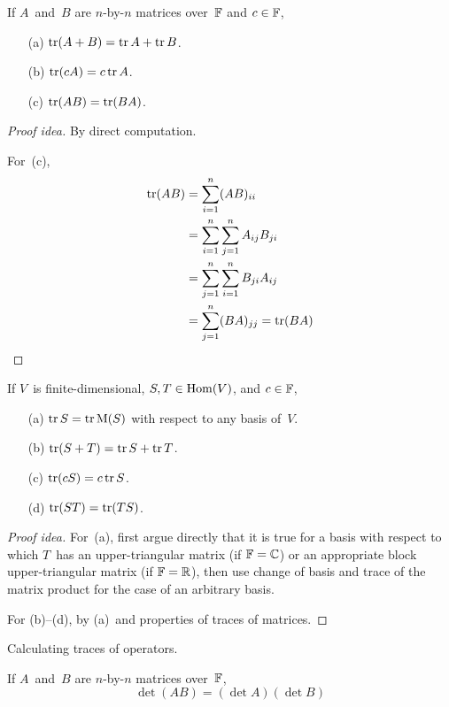 \begin{thm}
If \(A\)~and~\(B\) are \(n\)-by-\(n\) matrices over~\(\mathbb{F}\) and \(c\in\mathbb{F}\),
\begin{enumerate}[itemsep=0pt]
\item[(a)] \(\operatorname{tr}(A+B)=\operatorname{tr} A+\operatorname{tr} B\).
\item[(b)] \(\operatorname{tr}(cA)=c\operatorname{tr} A\).
\item[(c)] \(\operatorname{tr}(AB)=\operatorname{tr}(BA)\).
\end{enumerate}
\end{thm}
\begin{proof}[Proof idea]
By direct computation.

For~(c),
\begin{align*}
\operatorname{tr}(AB)&=\sum_{i=1}^n(AB)_{ii}\\
	&=\sum_{i=1}^n\sum_{j=1}^n A_{ij}B_{ji}\\
	&=\sum_{j=1}^n\sum_{i=1}^n B_{ji}A_{ij}\\
	&=\sum_{j=1}^n(BA)_{jj}=\operatorname{tr}(BA)\qedhere
\end{align*}
\end{proof}

\begin{thm}
If \(V\)~is finite-dimensional, \(S,T\in\operatorname{Hom}(V)\), and \(c\in\mathbb{F}\),
\begin{enumerate}[itemsep=0pt]
\item[(a)] \(\operatorname{tr} S=\operatorname{tr}\operatorname{M}(S)\) with respect to any basis of~\(V\).
\item[(b)] \(\operatorname{tr}(S+T)=\operatorname{tr} S+\operatorname{tr} T\).
\item[(c)] \(\operatorname{tr}(cS)=c\operatorname{tr} S\).
\item[(d)] \(\operatorname{tr}(ST)=\operatorname{tr}(TS)\).
\end{enumerate}
\end{thm}
\begin{proof}[Proof idea]
For~(a), first argue directly that it is true for a basis with respect to which \(T\)~has an upper-triangular matrix (if \(\mathbb{F}=\mathbb{C}\)) or an appropriate block upper-triangular matrix (if \(\mathbb{F}=\mathbb{R}\)), then use change of basis and trace of the matrix product for the case of an arbitrary basis.

For (b)--(d), by (a)~and properties of traces of matrices.
\end{proof}
\begin{app}
Calculating traces of operators.
\end{app}

\begin{thm}
If \(A\)~and~\(B\) are \(n\)-by-\(n\) matrices over~\(\mathbb{F}\),
\[\det(AB)=(\det A)(\det B)\]
\end{thm}

